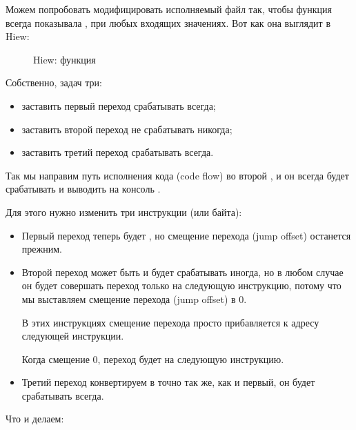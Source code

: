 



\clearpage
{}

Можем попробовать модифицировать исполняемый файл так, чтобы функция  всегда показывала ,
при любых входящих значениях.
Вот как она выглядит в Hiew:

\begin{figure}[H]
\centering
{}
\caption{Hiew: функция }
\label{fig:jcc_hiew_1}
\end{figure}

Собственно, задач три:
\begin{itemize}
\item заставить первый переход срабатывать всегда;
\item заставить второй переход не срабатывать никогда;
\item заставить третий переход срабатывать всегда.
\end{itemize}

Так мы направим путь исполнения кода (code flow) во второй \printf,
и он всегда будет срабатывать и выводить на консоль .

Для этого нужно изменить три инструкции (или байта):

\begin{itemize}
\item Первый переход теперь будет \JMP, но смещение перехода 
(\gls{jump offset}) останется прежним.

\item Второй переход может быть и будет срабатывать иногда, но в любом случае он будет совершать переход
только на следующую инструкцию, потому что мы выставляем смещение перехода (\gls{jump offset}) в 0.

В этих инструкциях смещение перехода просто прибавляется к адресу следующей инструкции.

Когда смещение 0, переход будет на следующую инструкцию.

\item Третий переход конвертируем в \JMP точно так же, как и первый, он будет срабатывать всегда.

\end{itemize}

\clearpage
Что и делаем:

